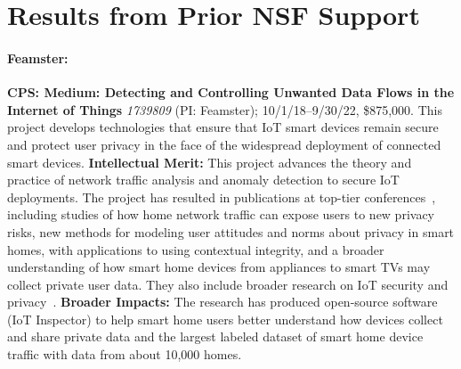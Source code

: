 \section{Results from Prior NSF Support}

\paragraph{Feamster:}
\textbf{CPS: Medium: Detecting and Controlling Unwanted
  Data Flows in the Internet of Things} \textit{1739809} (PI: Feamster);
10/1/18--9/30/22, \$875,000.
This
project develops technologies that ensure that IoT smart devices remain secure
and protect user privacy in the face of the widespread deployment of connected
smart devices.
\textbf{Intellectual Merit:} This project advances the theory and practice of network traffic
analysis and anomaly detection to secure IoT deployments. The project
has resulted in publications at top-tier
conferences~\cite{hooman2019:ccs,chu2018:iot:iotj,zheng2018:iot:cscw,feamster2018:iot:ctlj,doshi2018:iot,apthorpe2018:iot:imwut,datta2018:iot,acar2018:iot,weinberg2019:iot:www}, including studies of how home network traffic can
expose users to new privacy risks, new methods for modeling user attitudes and
norms about
privacy in smart homes, with applications to using contextual integrity,
and a broader understanding of how smart home
devices from appliances to smart
TVs may
collect private user data. They also include broader research on IoT
security and
privacy~\cite{chu2018:iot:iotj,zheng2018:iot:cscw,feamster2018:iot:ctlj,doshi2018:iot,apthorpe2018:iot:imwut,datta2018:iot,acar2018:iot,weinberg2019:iot:www}.
\textbf{Broader Impacts:} The research
has produced open-source software (IoT Inspector) to help smart home users better understand
how devices collect and share private data and the largest
labeled dataset of smart home device traffic with data from about 10,000
homes.
